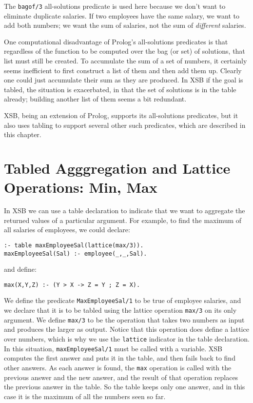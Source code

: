 The \verb|bagof/3| all-solutions predicate is used here because we
don't want to eliminate duplicate salaries.  If two employees have the
same salary, we want to add both numbers; we want the sum of salaries,
not the sum of {\em different} salaries.

One computational disadvantage of Prolog's all-solutions predicates is
that regardless of the function to be computed over the bag (or set)
of solutions, that list must still be created.  To accumulate the sum
of a set of numbers, it certainly seems inefficient to first construct
a list of them and then add them up.  Clearly one could just
accumulate their sum as they are produced.  In XSB if the goal is
tabled, the situation is exacerbated, in that the set of solutions is
in the table already; building another list of them seems a bit
redundant.

XSB, being an extension of Prolog, supports its all-solutions
predicates, but it also uses tabling to support several other such
predicates, which are described in this chapter.

\section{Tabled Agggregation and Lattice Operations: Min, Max}

In XSB we can use a table declaration to indicate that we want to
aggregate the returned values of a particular argument.  For example,
to find the maximum of all salaries of employees, we could declare:
\begin{verbatim}
:- table maxEmployeeSal(lattice(max/3)).
maxEmployeeSal(Sal) :- employee(_,_,Sal).
\end{verbatim}
and define:
\begin{verbatim}
max(X,Y,Z) :- (Y > X -> Z = Y ; Z = X).
\end{verbatim}
We define the predicate \verb|MaxEmployeeSal/1| to be true of employee
salaries, and we declare that it is to be tabled using the lattice
operation \verb|max/3| on its only argument.  We define \verb|max/3|
to be the operation that takes two numbers as input and produces the
larger as output.  Notice that this operation does define a lattice
over numbers, which is why we use the \verb|lattice| indicator in the
table declaration.  In this situation, \verb|maxEmployeeSal/1| must be
called with a variable.  XSB computes the first answer and puts it in
the table, and then fails back to find other answers.  As each answer
is found, the \verb|max| operation is called with the previous answer
and the new answer, and the result of that operation replaces the
previous answer in the table.  So the table keeps only one answer, and
in this case it is the maximum of all the numbers seen so far.  

